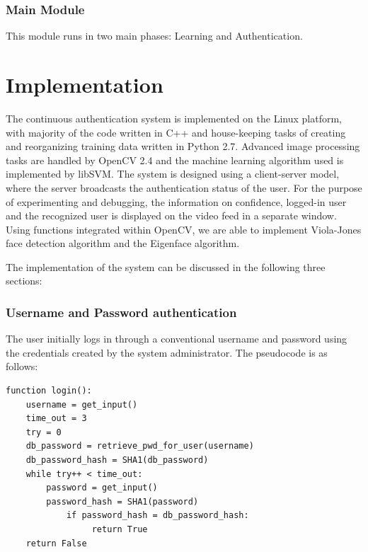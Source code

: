 \documentclass[12pt]{article}			%
\begin{document}
\subsubsection { Main Module }
This module runs in two main phases: Learning and Authentication.



\newpage

\section{ Implementation }  
The continuous authentication system is implemented on the Linux platform, with majority of the code written in C++ and house-keeping tasks of creating and reorganizing training data written in Python 2.7.
Advanced image processing tasks are handled by OpenCV 2.4\cite{opencv} and the machine learning algorithm used is implemented by libSVM\cite{libsvm}.
The system is designed using a client-server model, where the server broadcasts the authentication status of the user.
For the purpose of experimenting and debugging, the information on confidence, logged-in user and the recognized user is displayed on the video feed in a separate window. Using functions integrated within OpenCV, we are able to implement Viola-Jones face detection algorithm and the Eigenface algorithm.

The implementation of the system can be discussed in the following three sections:

\subsubsection{ Username and Password authentication }

The user initially logs in through a conventional username and password using the credentials created by the system administrator. The pseudocode is as follows:

\begin{verbatim}
function login():
    username = get_input()
    time_out = 3
    try = 0
    db_password = retrieve_pwd_for_user(username)
    db_password_hash = SHA1(db_password)
    while try++ < time_out:
        password = get_input()
        password_hash = SHA1(password)
            if password_hash = db_password_hash:
                 return True
    return False
\end{verbatim}
\end{document}
